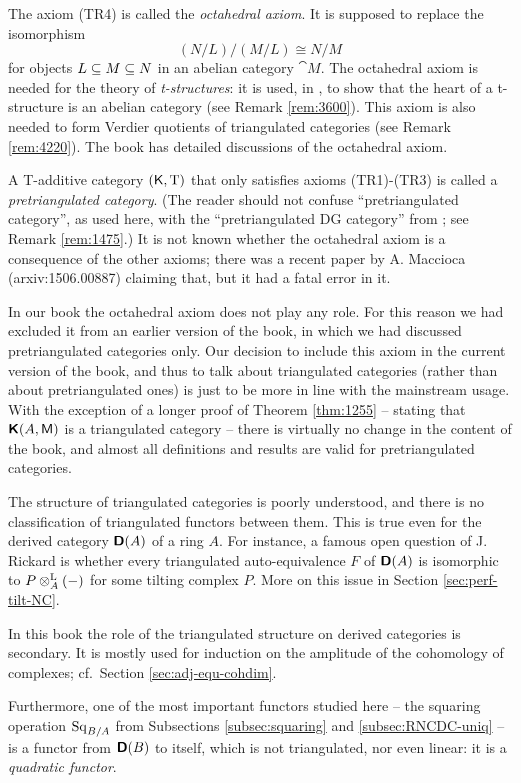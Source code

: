 \begin{rem} \label{rem:1281}
The axiom (TR4) is called the {\em octahedral axiom}.
It is supposed to replace the isomorphism  
\[ (N / L) / (M / L) \cong N / M \]
for objects $L \subseteq M \subseteq N$ in an abelian category $\cat{M}$. 
The octahedral axiom is needed for the theory of {\em t-structures}: it is 
used, in \cite{BBD}, to show that the heart of a t-structure is an abelian 
category (see Remark \ref{rem:3600}). This axiom is also needed to form 
Verdier quotients of triangulated categories (see Remark \ref{rem:4220}).
The book \cite{Ne1} has detailed discussions of the octahedral axiom. 

A T-additive category $(\operatorname{\mathsf{K}}, \operatorname{T})$ that only satisfies axioms 
(TR1)-(TR3) is called a {\em pretriangulated category}. 
(The reader should not confuse ``pretriangulated category'', as used here, with 
the ``pretriangulated DG category'' from \cite{BoKa}; see Remark 
\ref{rem:1475}.) It is not known whether the octahedral axiom is a consequence 
of the other axioms; there was a recent paper by A. Maccioca 
(arxiv:1506.00887) claiming that, but it had a fatal error in it.

In our book the octahedral axiom does not play any role. For this reason we had 
excluded it from an earlier version of the book, in which we had discussed 
pretriangulated categories only. Our decision to include this axiom in the 
current version of the book, and thus to talk about triangulated categories 
(rather than about pretriangulated ones) is just to be more in line with the 
mainstream usage. With the exception of a longer proof of Theorem 
\ref{thm:1255} -- stating that $\boldsymbol{\mathsf{K}}(A, \operatorname{\mathsf{M}})$ is a triangulated 
category -- there is virtually no change in the content of the book, and almost 
all definitions and results are valid for pretriangulated categories.  
\end{rem}

\begin{rem} \label{rem:2305}
The structure of triangulated categories is poorly understood, and there is no
classification of triangulated functors between them. This is true even 
for the derived category $\boldsymbol{\mathsf{D}}(A)$ of a ring $A$. For instance, a famous 
open question of J. Rickard is whether every triangulated auto-equivalence $F$ 
of $\boldsymbol{\mathsf{D}}(A)$ is isomorphic to $P \otimes^{\mathrm{L}}_{A} (-)$ for some tilting 
complex $P$. More on this issue in Section \ref{sec:perf-tilt-NC}. 

In this book the role of the triangulated structure on derived categories is 
secondary. It is mostly used for induction on the amplitude of the cohomology 
of complexes; cf.\ Section \ref{sec:adj-equ-cohdim}. 

Furthermore, one of the most important functors studied here -- the squaring 
operation $\operatorname{Sq}_{B / A}$ from Subsections \ref{subsec:squaring} and
\ref{subsec:RNCDC-uniq} -- is a functor from $\boldsymbol{\mathsf{D}}(B)$ to itself, which is 
not triangulated, nor even linear: it is a {\em quadratic functor}. 
\end{rem}




